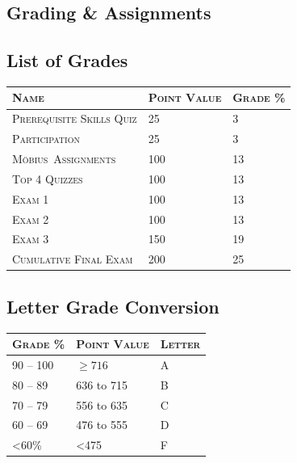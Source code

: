 \documentclass[letterpaper,twoside]{article}
\def\Mobius{M\"obius\ }
\begin{document}
\begin{multicols*}{2}
    \section*{Grading \& Assignments}
    \subsection*{List of Grades}
    \begin{center}
        \doublespacing
        \begin{tabularx}{\columnwidth}{lll}
            \textsc{Name} & \textsc{Point Value} & \textsc{Grade \%}\\
            \hline
            \small
            \textsc{Prerequisite Skills Quiz} & 25 & 3\\
            \small
            \textsc{Participation} & 25 & 3\\
            \small
            \textsc{\Mobius Assignments} & 100 & 13\\
            \small
            \textsc{Top 4 Quizzes} & 100 & 13\\
            \small
            \textsc{Exam 1} & 100 & 13\\
            \small
            \textsc{Exam 2} & 100 & 13\\
            \small
            \textsc{Exam 3} & 150 & 19\\
            \small
            \textsc{Cumulative Final Exam} & 200 & 25\\
        \end{tabularx}
        \subsection*{Letter Grade Conversion\hfill}
        \begin{tabularx}{\columnwidth}{lll}
            \textsc{Grade \%} & \textsc{Point Value} & \textsc{Letter}\\
            \hline
            \small
            90 -- 100 & $\geq 716$ & A\\
            \small
            80 -- 89 & 636 to 715 & B\\
            \small
            70 -- 79 & 556 to 635 & C\\
            \small
            60 -- 69 & 476 to 555 & D\\
            \small
            <60\% & <475 & F\\
        \end{tabularx}


\end{center}
\end{multicols*}
\end{document}
